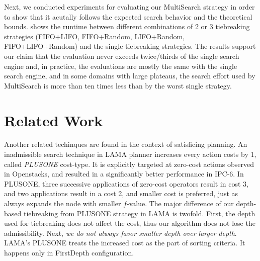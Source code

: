 Next, we conducted experiments for evaluating our MultiSearch
strategy in order to show that it acutally follows the expected search
behavior and the theoretical bounds.
 shows the runtime between
different combinations of 2 or 3 tiebreaking strategies (FIFO+LIFO,
FIFO+Random, LIFO+Random, FIFO+LIFO+Random) and the single tiebreaking
strategies. The results support our claim that the evaluation never
exceeds twice/thirds of the single search engine and, in practice, the
evaluations are mostly the same with the single search engine, and in
some domains with large plateaus, the search effort used by MultiSearch
is more than ten times less than by the worst single strategy.



\begin{figure}[htbp]
 \centering
 \caption{}
 \label{portfolio}
\end{figure}


\section{Related Work}
\label{sec-4}

Another related techinques are found in the context of satisficing planning.
An inadmissible search technique in LAMA planner \cite{richter2010lama}
increases every action costs by 1, called \emph{PLUSONE} cost-type.
It is explicitly targeted at zero-cost actions observed in Openstacks,
and resulted in a significantly better performance in IPC-6.
In PLUSONE, three successive
applications of zero-cost operators result in cost 3, and two
applications result in a cost 2, and smaller cost is preferred, just as
\astar always expands the node with smaller $f$-value.
The major difference of our depth-based tiebreaking from PLUSONE
strategy in LAMA is twofold.  First, the depth used for tiebreaking does
not affect the cost, thus our algorithm does not lose the
admissibility. Next, \emph{we do not always favor smaller depth over
larger depth}. LAMA's PLUSONE treats the increased cost as the part of
sorting criteria. It happens only in FirstDepth configuration.

